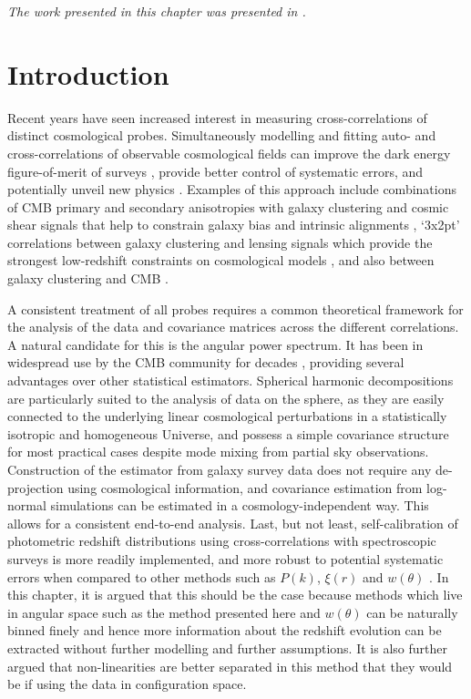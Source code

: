 \textit{The work presented in this chapter was presented in \citet{2018LoureiroBOSS}.} 

\newpage
\section{Introduction}\label{sec:BOSS:intro}
Recent years have seen increased interest in measuring cross-correlations of distinct cosmological probes. Simultaneously modelling and fitting auto- and cross-correlations of observable cosmological fields can improve the dark energy figure-of-merit of surveys \citep{2008PhRvD..77l3525W}, provide better control of systematic errors, and potentially unveil new physics \citep[e.g.][]{Kirk2015}. Examples of this approach include combinations of CMB primary and secondary anisotropies with galaxy clustering and cosmic shear signals that help to constrain galaxy bias and intrinsic alignments \citep{Giannantonio2016, Hand2015}, `3x2pt' correlations between galaxy clustering and lensing signals which provide the strongest low-redshift constraints on cosmological models \citep{2017MNRAS.465.1454H, 2017arXiv170801530D}, and also between galaxy clustering and CMB \citep{2016Nicola, 2017Nicola, Doux2017}.

\qquad A consistent treatment of all probes requires a common theoretical framework for the analysis of the data and covariance matrices across the different correlations. A natural candidate for this is the angular power spectrum. It has been in widespread use by the CMB community for decades \citep{COBE,Healpix,Polspice0,PolSpiceSzapudi2001,PolSpice2001}, providing several advantages over other statistical estimators. Spherical harmonic decompositions are particularly suited to the analysis of data on the sphere, as they are easily connected to the underlying linear cosmological perturbations in a statistically isotropic and homogeneous Universe, and possess a simple covariance structure for most practical cases despite mode mixing from partial sky observations. Construction of the estimator from galaxy survey data does not require any de-projection using cosmological information, and covariance estimation from log-normal simulations can be estimated in a cosmology-independent way. This allows for a consistent end-to-end analysis. Last, but not least, self-calibration of photometric redshift distributions using cross-correlations with spectroscopic surveys is more readily implemented, and more robust to potential systematic errors \citep{McQuinnWhite2013, 2016McLeod} when compared to other methods such as $P(k)$, $\xi(r)$ and $w(\theta)$ \citep{2017RossBOSS,2017SalazarBOSSwTheta}.  In this chapter, it is argued that this should be the case because methods which live in angular space such as the method presented here and $w(\theta)$ can be naturally binned finely and hence more information about the redshift evolution can be extracted without further modelling and further assumptions. It is also further argued that non-linearities are better separated in this method that they would be if using the data in configuration space.

